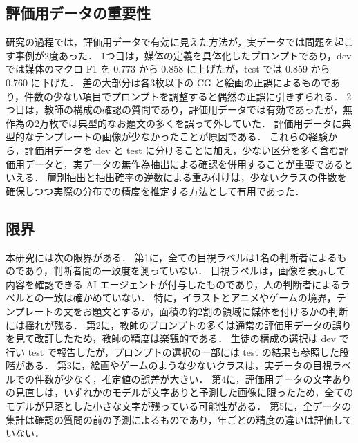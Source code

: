 \subsection{評価用データの重要性}
研究の過程では，評価用データで有効に見えた方法が，実データでは問題を起こす事例が2度あった．
1つ目は，媒体の定義を具体化したプロンプトであり，dev では媒体のマクロ F1 を 0.773 から 0.858 に上げたが，test では 0.859 から 0.760 に下げた．
差の大部分は各3枚以下の CG と絵画の正誤によるものであり，件数の少ない項目でプロンプトを調整すると偶然の正誤に引きずられる．
2つ目は，教師の構成の確認の質問であり，評価用データでは有効であったが，無作為の2万枚では典型的なお題文の多くを誤って外していた．
評価用データに典型的なテンプレートの画像が少なかったことが原因である．
これらの経験から，評価用データを dev と test に分けることに加え，少ない区分を多く含む評価用データと，実データの無作為抽出による確認を併用することが重要であるといえる．
層別抽出と抽出確率の逆数による重み付けは，少ないクラスの件数を確保しつつ実際の分布での精度を推定する方法として有用であった．

\subsection{限界}
本研究には次の限界がある．
第1に，全ての目視ラベルは1名の判断者によるものであり，判断者間の一致度を測っていない．
目視ラベルは，画像を表示して内容を確認できる AI エージェントが付与したものであり，人の判断者によるラベルとの一致は確かめていない．
特に，イラストとアニメやゲームの境界，テンプレートの文をお題文とするか，面積の約2割の領域に媒体を付けるかの判断には揺れが残る．
第2に，教師のプロンプトの多くは通常の評価用データの誤りを見て改訂したため，教師の精度は楽観的である．
生徒の構成の選択は dev で行い test で報告したが，プロンプトの選択の一部には test の結果も参照した段階がある．
第3に，絵画やゲームのような少ないクラスは，実データの目視ラベルでの件数が少なく，推定値の誤差が大きい．
第4に，評価用データの文字ありの見直しは，いずれかのモデルが文字ありと予測した画像に限ったため，全てのモデルが見落とした小さな文字が残っている可能性がある．
第5に，全データの集計は確認の質問の前の予測によるものであり，年ごとの精度の違いは評価していない．
